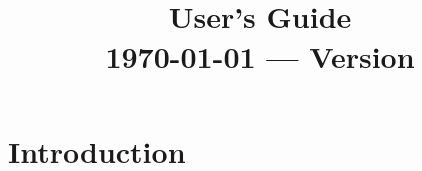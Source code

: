 \documentclass[a4paper,11pt]{book}
\title{\textbf{\Huge \akantu}\\
  \vspace{0.5cm}
  \textbf{\huge User's Guide}\\
  \vspace{1cm}
  {\small \today{} --- Version \version}
}
\date{}
\newcommand{\code}[1]{\texttt{#1}}
\begin{document}
\maketitle

\tableofcontents

\chapter{Introduction}







\end{document}
